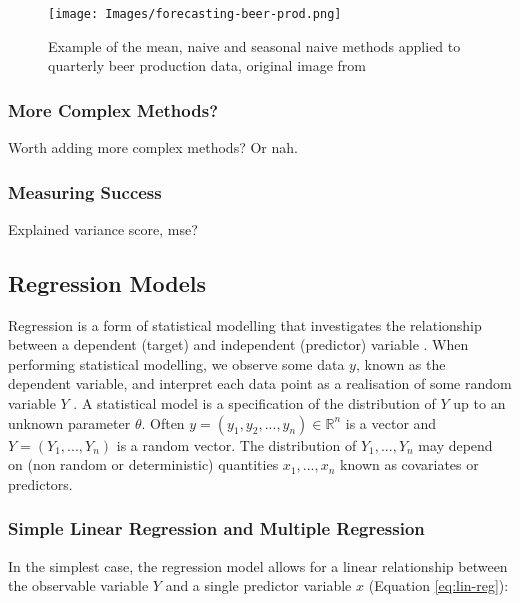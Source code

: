 \begin{figure}[H]
\begin{center}
    \texttt{[image: Images/forecasting-beer-prod.png]}
    \caption{Example of the mean, naive and seasonal naive methods applied to quarterly beer production data, original image from \cite{forecasting-book}}
    \label{fig:forecasting}
\end{center}
\end{figure}

\subsubsection{More Complex Methods?}

Worth adding more complex methods? Or nah.

\subsubsection{Measuring Success}

Explained variance score, mse?

\subsection{Regression Models}
\label{section:regression-models-research}

Regression is a form of statistical modelling that investigates the relationship between a dependent (target) and independent (predictor) variable \cite{regression-techniques}. When performing statistical modelling, we observe some data $y$, known as the dependent variable, and interpret each data point as a realisation of some random variable $Y$ \cite{m2s2-notes}. A statistical model is a specification of the distribution of $Y$ up to an unknown parameter $\theta$. Often $y = (y_1, y_2, ..., y_n) \in \mathbb{R} ^ n$ is a vector and $Y = (Y_1, ..., Y_n)$ is a random vector. The distribution of $Y_1, ..., Y_n$ may depend on (non random or deterministic) quantities $x_1, ..., x_n$ known as covariates or predictors. 

\subsubsection{Simple Linear Regression and Multiple Regression}

In the simplest case, the regression model allows for a linear relationship between the observable variable $Y$ and a single predictor variable $x$ (Equation \ref{eq:lin-reg}): 

